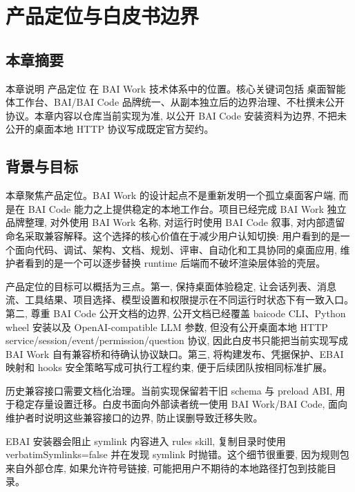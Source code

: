 \chapter{产品定位与白皮书边界}
\section{本章摘要}
本章说明 产品定位 在 BAI Work 技术体系中的位置。核心关键词包括 桌面智能体工作台、BAI/BAI Code 品牌统一、从副本独立后的边界治理、不杜撰未公开协议。本章内容以仓库当前实现为准, 以公开 BAI Code 安装资料为边界, 不把未公开的桌面本地 HTTP 协议写成既定官方契约。

\section{背景与目标}
本章聚焦产品定位。BAI Work 的设计起点不是重新发明一个孤立桌面客户端, 而是在 BAI Code 能力之上提供稳定的本地工作台。项目已经完成 BAI Work 独立品牌整理, 对外使用 BAI Work 名称, 对运行时使用 BAI Code 叙事, 对内部遗留命名采取兼容解释。这个选择的核心价值在于减少用户认知切换: 用户看到的是一个面向代码、调试、架构、文档、规划、评审、自动化和工具协同的桌面应用, 维护者看到的是一个可以逐步替换 runtime 后端而不破坏渲染层体验的壳层。

产品定位的目标可以概括为三点。第一, 保持桌面体验稳定, 让会话列表、消息流、工具结果、项目选择、模型设置和权限提示在不同运行时状态下有一致入口。第二, 尊重 BAI Code 公开文档的边界, 公开文档已经覆盖 baicode CLI、Python wheel 安装以及 OpenAI-compatible LLM 参数, 但没有公开桌面本地 HTTP service/session/event/permission/question 协议, 因此白皮书只能把当前实现写成 BAI Work 自有兼容桥和待确认协议缺口。第三, 将构建发布、凭据保护、EBAI 映射和 hooks 安全策略写成可执行工程约束, 便于后续团队按相同标准扩展。

历史兼容接口需要文档化治理。当前实现保留若干旧 schema 与 preload ABI, 用于稳定存量设置迁移。白皮书面向外部读者统一使用 BAI Work/BAI Code, 面向维护者时说明这些兼容接口的边界, 防止误删导致迁移失败。

EBAI 安装器会阻止 symlink 内容进入 rules skill, 复制目录时使用 verbatimSymlinks=false 并在发现 symlink 时抛错。这个细节很重要, 因为规则包来自外部仓库, 如果允许符号链接, 可能把用户不期待的本地路径打包到技能目录。

